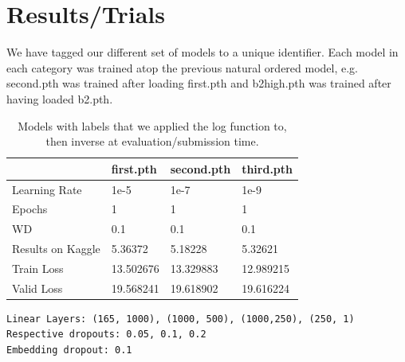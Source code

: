 \documentclass[10pt,twocolumn,letterpaper]{article}
\begin{document}
\section{Results/Trials}
  We have tagged our different set of models to a unique identifier. Each model
  in each category was trained atop the previous natural ordered model, e.g.
  second.pth was trained after loading first.pth and b2high.pth was trained
  after having loaded b2.pth.

\begin{table}[]
  \begin{center}
    \begin{tabular}{|l|l|l|l|}
    \hline
                      & first.pth & second.pth & third.pth \\ \hline
    Learning Rate     & 1e-5      & 1e-7       & 1e-9      \\ \hline
    Epochs            & 1         & 1          & 1         \\ \hline
    WD                & 0.1       & 0.1        & 0.1       \\ \hline
    Results on Kaggle & 5.36372   & 5.18228    & 5.32621   \\ \hline
    Train Loss        & 13.502676 & 13.329883  & 12.989215 \\ \hline
    Valid Loss        & 19.568241 & 19.618902  & 19.616224 \\ \hline
    \end{tabular}
    {\scriptsize
    \begin{verbatim}
Linear Layers: (165, 1000), (1000, 500), (1000,250), (250, 1)
Respective dropouts: 0.05, 0.1, 0.2
Embedding dropout: 0.1
    \end{verbatim}}
  \end{center}
  \caption{Models with labels that we applied the log function to, then inverse at
  evaluation/submission time.}
\end{table}
\end{document}
